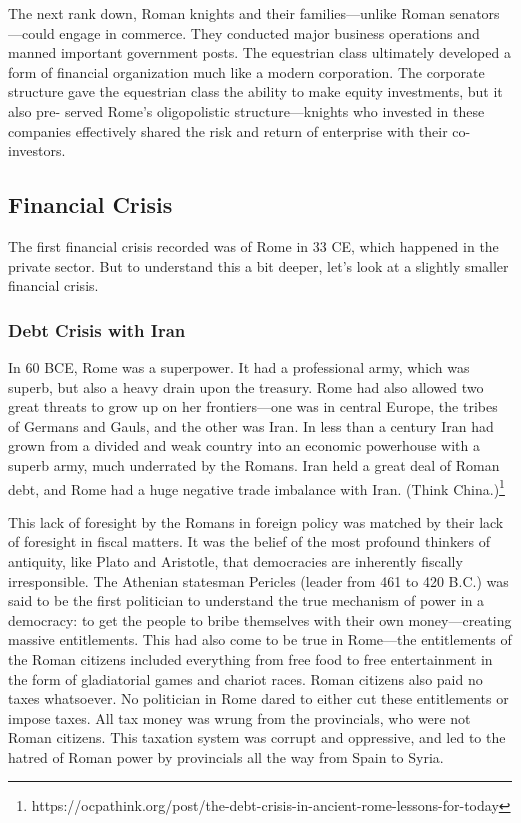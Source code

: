 \documentclass{article}
\begin{document}
    The next rank down, Roman knights and their families—unlike Roman senators—could engage in commerce. They conducted major business operations and manned important government posts. The equestrian class ultimately developed a form of financial organization much like a modern corporation. The corporate structure gave the equestrian class the ability to make equity investments, but it also pre- served Rome’s oligopolistic structure—knights who invested in these companies effectively shared the risk and return of enterprise with their co-investors.

  \subsection{Financial Crisis}

    The first financial crisis recorded was of Rome in 33 CE, which happened in the private sector. But to understand this a bit deeper, let's look at a slightly smaller financial crisis. 
    
    \subsubsection{Debt Crisis with Iran}

      In 60 BCE, Rome was a superpower. It had a professional army, which was superb, but also a heavy drain upon the treasury. Rome had also allowed two great threats to grow up on her frontiers—one was in central Europe, the tribes of Germans and Gauls, and the other was Iran. In less than a century Iran had grown from a divided and weak country into an economic powerhouse with a superb army, much underrated by the Romans. Iran held a great deal of Roman debt, and Rome had a huge negative trade imbalance with Iran. (Think China.)\footnote{https://ocpathink.org/post/the-debt-crisis-in-ancient-rome-lessons-for-today}

      This lack of foresight by the Romans in foreign policy was matched by their lack of foresight in fiscal matters. It was the belief of the most profound thinkers of antiquity, like Plato and Aristotle, that democracies are inherently fiscally irresponsible. The Athenian statesman Pericles (leader from 461 to 420 B.C.) was said to be the first politician to understand the true mechanism of power in a democracy: to get the people to bribe themselves with their own money—creating massive entitlements. This had also come to be true in Rome—the entitlements of the Roman citizens included everything from free food to free entertainment in the form of gladiatorial games and chariot races. Roman citizens also paid no taxes whatsoever. No politician in Rome dared to either cut these entitlements or impose taxes. All tax money was wrung from the provincials, who were not Roman citizens. This taxation system was corrupt and oppressive, and led to the hatred of Roman power by provincials all the way from Spain to Syria.
\end{document}

